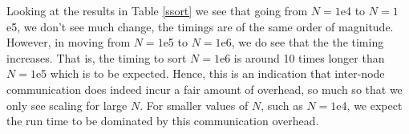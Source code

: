 \documentclass[10pt]{article}
\begin{document}
\begin{enumerate}
Looking at the results in Table \ref{ssort} we see that going from $N=1$e4 to $N=1$e5, we don't see much change, the timings are of the same order of magnitude. However, in moving from $N=1$e5 to $N=1$e6, we do see that the the timing increases. That is, the timing to sort $N=1$e6 is around 10 times longer than $N=1$e5 which is to be expected. Hence, this is an indication that inter-node communication does indeed incur a fair amount of overhead, so much so that we only see scaling for large $N$. For smaller values of $N$, such as $N=1$e4, we expect the run time to be dominated by this communication overhead.


\end{enumerate}
	







    
    
\end{document}
